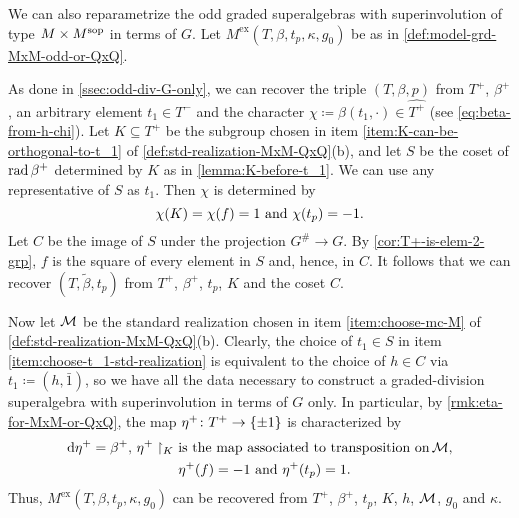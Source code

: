 We can also reparametrize the odd graded superalgebras with superinvolution of type $M\times M^{\mathrm{sop}}$ in terms of $G$. 
Let $M^{\mathrm{ex}}(T, \beta, t_p, \kappa, g_0)$ be as in \cref{def:model-grd-MxM-odd-or-QxQ}. 

As done in \cref{ssec:odd-div-G-only}, we can recover the triple $(T, \beta, p)$ from $T^+$, $\beta^+$, an arbitrary element $t_1 \in T^-$ and the character $\chi \coloneqq \beta(t_1, \cdot) \in \widehat{T^+}$ (see \cref{eq:beta-from-h-chi}). 
Let $K \subseteq T^+$ be the subgroup chosen in item \eqref{item:K-can-be-orthogonal-to-t_1} of \cref{def:std-realization-MxM-QxQ}(b), and let $S$ be the coset of $\operatorname{rad} \beta^+$ determined by $K$ as in \cref{lemma:K-before-t_1}. 
We can use any representative of $S$ as $t_1$. 
Then $\chi$ is determined by
\[\label{eq:equivalent-def-of-chi}
    \chi(K) = \chi(f) = 1 \,\,\text{and}\,\, \chi(t_p) = -1.
\]
Let $C$ be the image of $S$ under the projection $G^\# \to G$. 
By \cref{cor:T+-is-elem-2-grp}, $f$ is the square of every element in $S$ and, hence, in $C$.
It follows that we can recover $(T, \tilde\beta, t_p)$ from $T^+$, $\beta^+$, $t_p$, $K$ and the coset $C$. 

Now let $\mathcal M$ be the standard realization chosen in item \eqref{item:choose-mc-M} of \cref{def:std-realization-MxM-QxQ}(b). 
Clearly, the choice of $t_1 \in S$ in item \eqref{item:choose-t_1-std-realization} is equivalent to the choice of $h\in C$ via $t_1 \coloneqq (h, \bar 1)$, so we have all the data necessary to construct a graded-division superalgebra with superinvolution in terms of $G$ only. 
In particular, by \cref{rmk:eta-for-MxM-or-QxQ}, the map $\eta^+\colon T^+ \to \{ \pm 1 \}$ is characterized by
\[\label{eq:eta+-unsharpening-MxM}
    \begin{aligned}
        \mathrm{d}\eta^+ = \beta^+,\, \eta^+\restriction_{K} \,\, &\text{is the map associated to transposition on}\, \mathcal M,\\ 
        &\eta^+(f) = -1 \,\,\text{and}\,\, \eta^+(t_p) =1. 
    \end{aligned}
\]
Thus, $M^{\mathrm{ex}}(T, \beta, t_p, \kappa, g_0)$ can be recovered from $T^+$, $\beta^+$, $t_p$, $K$, $h$, $\mathcal M$, $g_0$ and $\kappa$. 


